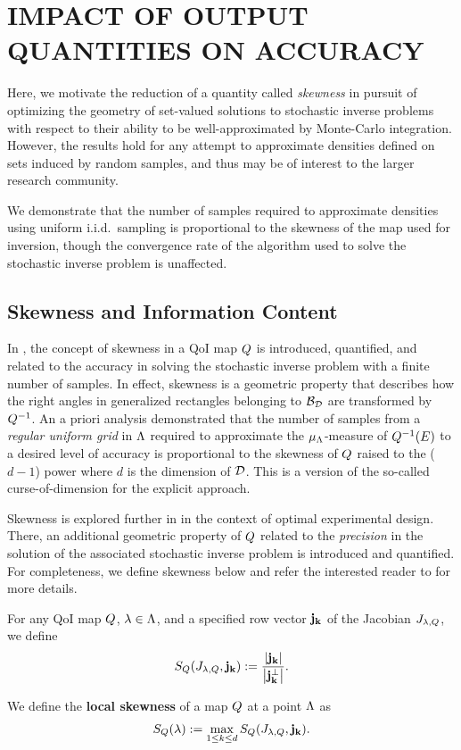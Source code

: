 \chapter{\uppercase{Impact of Output Quantities on Accuracy} \label{chapter:03}}

Here, we motivate the reduction of a quantity called \emph{skewness} in pursuit of optimizing the geometry of set-valued solutions to stochastic inverse problems with respect to their ability to be well-approximated by Monte-Carlo integration.
However, the results hold for any attempt to approximate densities defined on sets induced by random samples, and thus may be of interest to the larger research community.

We demonstrate that the number of samples required to approximate densities using uniform i.i.d.~sampling is proportional to the skewness of the map used for inversion, though the convergence rate of the algorithm used to solve the stochastic inverse problem is unaffected.



\section{Skewness and Information Content}\label{sec:skewness}
In \cite{BGE+15}, the concept of skewness in a QoI map $Q$ is introduced, quantified, and related to the accuracy in solving the stochastic inverse problem with a finite number of samples.
In effect, skewness is a geometric property that describes how the right angles in generalized rectangles belonging to $\mathcal{B}_{\mathcal{D}}$ are transformed by $Q^{-1}$.
An a priori analysis demonstrated that the number of samples from a {\em regular uniform grid} in ${\Lambda}$ required to approximate the $\mu_{{\Lambda}}$-measure of $Q^{-1}(E)$ to a desired level of accuracy is proportional to the skewness of $Q$ raised to the ($d-1$) power where $d$ is the dimension of $\mathcal{D}$.
This is a version of the so-called curse-of-dimension for the explicit approach.

Skewness is explored further in \cite{Walsh} in the context of optimal experimental design.
There, an additional geometric property of $Q$ related to the \emph{precision} in the solution of the associated stochastic inverse problem is introduced and quantified.
For completeness, we define skewness below and refer the interested reader to \cite{BGE+15, BPW17, Walsh} for more details.

\begin{defn}
For any QoI map $Q$, $\lambda \in {\Lambda}$, and a specified row vector $\bf{j}_k$ of the Jacobian $J_{\lambda, Q}$, we define
\begin{equation}
S_Q(J_{\lambda,Q}, \bf{j}_k) := \frac{\left\vert\bf{j}_k\right\vert }{\left\vert\bf{j}_k^\perp\right\vert}.
\label{eq:skewness}
\end{equation}

We define the \textbf{local skewness} of a map $Q$ at a point ${\Lambda}$ as
\begin{equation}
S_Q(\lambda) := \max_{1\leq k \leq d} S_Q(J_{\lambda,Q}, \bf{j}_k).
\label{eq:localskewness}
\end{equation}
\end{defn}

